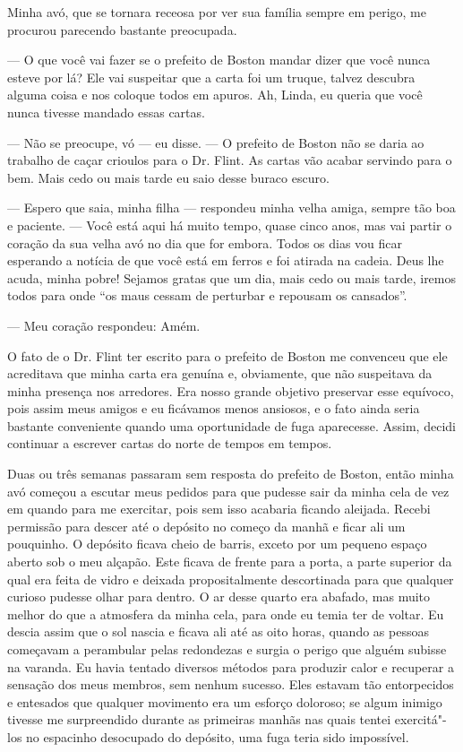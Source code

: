 Minha avó, que se tornara receosa por
ver sua família sempre em perigo, me procurou parecendo bastante
preocupada.

--- O que você vai fazer se o prefeito de Boston mandar dizer que você
nunca esteve por lá? Ele vai suspeitar que a carta foi um truque, talvez
descubra alguma coisa e nos coloque todos em apuros. Ah, Linda, eu
queria que você nunca tivesse mandado essas cartas.

--- Não se preocupe, vó --- eu disse.
--- O prefeito de Boston não se daria ao trabalho de caçar crioulos para
o Dr. Flint. As cartas vão acabar servindo para o bem. Mais cedo ou mais
tarde eu saio desse buraco escuro.

--- Espero que saia, minha filha ---
respondeu minha velha amiga, sempre tão boa e paciente. --- Você está
aqui há muito tempo, quase cinco anos, mas vai partir o coração da sua
velha avó no dia que for embora. Todos os dias vou ficar esperando a
notícia de que você está em ferros e foi atirada na cadeia. Deus lhe
acuda, minha pobre! Sejamos gratas que um dia, mais cedo ou mais tarde,
iremos todos para onde ``os maus cessam de perturbar e repousam os
cansados''.

--- Meu coração respondeu: Amém.

O fato de o Dr. Flint ter escrito para
o prefeito de Boston me convenceu que ele acreditava que minha carta era
genuína e, obviamente, que não suspeitava da minha presença nos
arredores. Era nosso grande objetivo preservar esse equívoco, pois assim
meus amigos e eu ficávamos menos ansiosos, e o fato ainda seria bastante
conveniente quando uma oportunidade de fuga aparecesse. Assim, decidi
continuar a escrever cartas do norte de tempos em tempos.

Duas ou três semanas passaram sem
resposta do prefeito de Boston, então minha avó começou a escutar meus
pedidos para que pudesse sair da minha cela de vez em quando para me
exercitar, pois sem isso acabaria ficando aleijada. Recebi permissão
para descer até o depósito no começo da manhã e ficar ali um pouquinho.
O depósito ficava cheio de barris, exceto por um pequeno espaço aberto
sob o meu alçapão. Este ficava de frente para a porta, a parte superior
da qual era feita de vidro e deixada propositalmente descortinada para
que qualquer curioso pudesse olhar para dentro. O ar desse quarto era
abafado, mas muito melhor do que a atmosfera da minha cela, para onde eu
temia ter de voltar. Eu descia assim que o sol nascia e ficava ali até
as oito horas, quando as pessoas começavam a perambular pelas redondezas
e surgia o perigo que alguém subisse na varanda. Eu havia tentado
diversos métodos para produzir calor e recuperar a sensação dos meus
membros, sem nenhum sucesso. Eles estavam tão entorpecidos e entesados
que qualquer movimento era um esforço doloroso; se algum inimigo tivesse
me surpreendido durante as primeiras manhãs nas quais tentei
exercitá"-los no espacinho desocupado do depósito, uma fuga teria sido
impossível.

